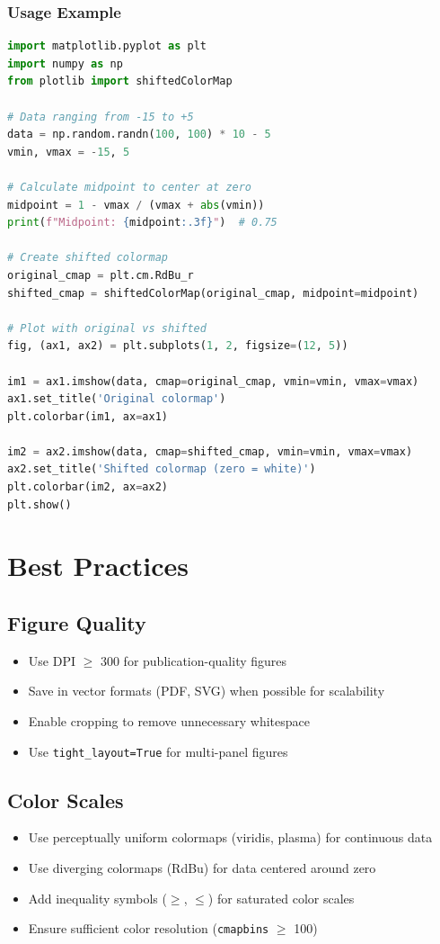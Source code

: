 \documentclass[11pt,a4paper]{article}
\begin{document}
\subsubsection{Usage Example}
\begin{lstlisting}[language=Python, caption=Shifting colormap center for asymmetric data]
import matplotlib.pyplot as plt
import numpy as np
from plotlib import shiftedColorMap

# Data ranging from -15 to +5
data = np.random.randn(100, 100) * 10 - 5
vmin, vmax = -15, 5

# Calculate midpoint to center at zero
midpoint = 1 - vmax / (vmax + abs(vmin))
print(f"Midpoint: {midpoint:.3f}")  # 0.75

# Create shifted colormap
original_cmap = plt.cm.RdBu_r
shifted_cmap = shiftedColorMap(original_cmap, midpoint=midpoint)

# Plot with original vs shifted
fig, (ax1, ax2) = plt.subplots(1, 2, figsize=(12, 5))

im1 = ax1.imshow(data, cmap=original_cmap, vmin=vmin, vmax=vmax)
ax1.set_title('Original colormap')
plt.colorbar(im1, ax=ax1)

im2 = ax2.imshow(data, cmap=shifted_cmap, vmin=vmin, vmax=vmax)
ax2.set_title('Shifted colormap (zero = white)')
plt.colorbar(im2, ax=ax2)
plt.show()
\end{lstlisting}

\section{Best Practices}

\subsection{Figure Quality}
\begin{itemize}[leftmargin=*]
    \item Use DPI $\geq$ 300 for publication-quality figures
    \item Save in vector formats (PDF, SVG) when possible for scalability
    \item Enable cropping to remove unnecessary whitespace
    \item Use \texttt{tight\_layout=True} for multi-panel figures
\end{itemize}

\subsection{Color Scales}
\begin{itemize}[leftmargin=*]
    \item Use perceptually uniform colormaps (viridis, plasma) for continuous data
    \item Use diverging colormaps (RdBu) for data centered around zero
    \item Add inequality symbols ($\geq$, $\leq$) for saturated color scales
    \item Ensure sufficient color resolution (\texttt{cmapbins} $\geq$ 100)
\end{itemize}
\end{document}
